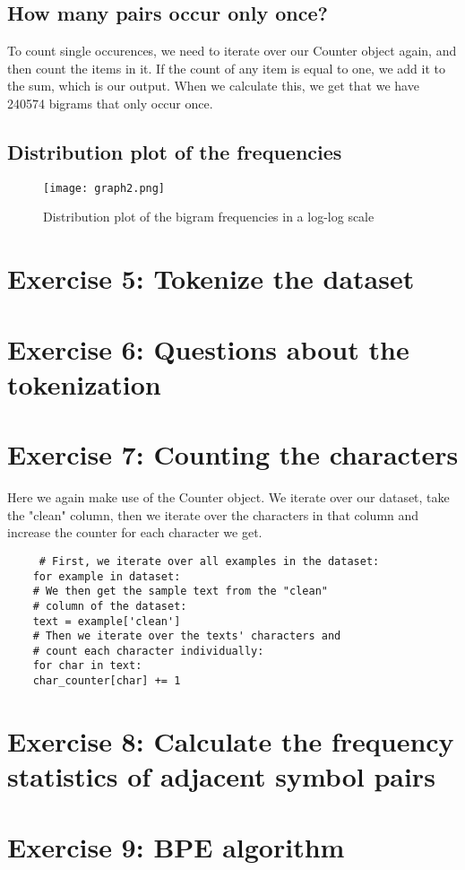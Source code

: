 \documentclass[11pt]{article}
\begin{document}
\subsection{How many pairs occur only once?}
To count single occurences, we need to iterate over our Counter object again, and then count the items in it. If the count of any item is equal to one, we add it to the sum, which is our output. When we calculate this, we get that we have 240574 bigrams that only occur once. 
\subsection{Distribution plot of the frequencies}
\begin{figure}[h]
	\texttt{[image: graph2.png]}
	\caption{Distribution plot of the bigram frequencies in a log-log scale}
\end{figure}
\section{Exercise 5: Tokenize the dataset}

\section{Exercise 6: Questions about the tokenization}

\section{Exercise 7: Counting the characters}
Here we again make use of the Counter object. We iterate over our dataset, take the "clean" column, then we iterate over the characters in that column and increase the counter for each character we get. 
\begin{verbatim}
	 # First, we iterate over all examples in the dataset:
	for example in dataset:
	# We then get the sample text from the "clean"
	# column of the dataset:
	text = example['clean']
	# Then we iterate over the texts' characters and
	# count each character individually:
	for char in text:
	char_counter[char] += 1
\end{verbatim}

\section{Exercise 8: Calculate the frequency statistics of adjacent symbol pairs}

\section{Exercise 9: BPE algorithm}
\end{document}
